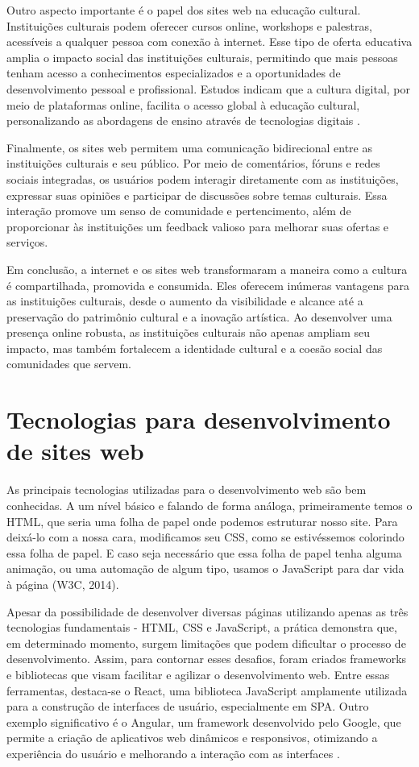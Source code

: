 Outro aspecto importante é o papel dos sites web na educação cultural. Instituições culturais podem oferecer cursos online, workshops e palestras, acessíveis a qualquer pessoa com conexão à internet. Esse tipo de oferta educativa amplia o impacto social das instituições culturais, permitindo que mais pessoas tenham acesso a conhecimentos especializados e a oportunidades de desenvolvimento pessoal e profissional. Estudos indicam que a cultura digital, por meio de plataformas online, facilita o acesso global à educação cultural, personalizando as abordagens de ensino através de tecnologias digitais \cite{xiong2019}.

Finalmente, os sites web permitem uma comunicação bidirecional entre as instituições culturais e seu público. Por meio de comentários, fóruns e redes sociais integradas, os usuários podem interagir diretamente com as instituições, expressar suas opiniões e participar de discussões sobre temas culturais. Essa interação promove um senso de comunidade e pertencimento, além de proporcionar às instituições um feedback valioso para melhorar suas ofertas e serviços.

Em conclusão, a internet e os sites web transformaram a maneira como a cultura é compartilhada, promovida e consumida. Eles oferecem inúmeras vantagens para as instituições culturais, desde o aumento da visibilidade e alcance até a preservação do patrimônio cultural e a inovação artística. Ao desenvolver uma presença online robusta, as instituições culturais não apenas ampliam seu impacto, mas também fortalecem a identidade cultural e a coesão social das comunidades que servem.

\section{Tecnologias para desenvolvimento de sites web}

As principais tecnologias utilizadas para o desenvolvimento web são bem conhecidas. A um nível básico e falando de forma análoga, primeiramente temos o \ac{HTML}, que seria uma folha de papel onde podemos estruturar nosso site. Para deixá-lo com a nossa cara, modificamos seu \ac{CSS}, como se estivéssemos colorindo essa folha de papel. E caso seja necessário que essa folha de papel tenha alguma animação, ou uma automação de algum tipo, usamos o JavaScript para dar vida à página (W3C, 2014).

Apesar da possibilidade de desenvolver diversas páginas utilizando apenas as três tecnologias fundamentais - \ac{HTML}, \ac{CSS} e JavaScript, a prática demonstra que, em determinado momento, surgem limitações que podem dificultar o processo de desenvolvimento. Assim, para contornar esses desafios, foram criados frameworks e bibliotecas que visam facilitar e agilizar o desenvolvimento web. Entre essas ferramentas, destaca-se o React, uma biblioteca JavaScript amplamente utilizada para a construção de interfaces de usuário, especialmente em \ac{SPA}. Outro exemplo significativo é o Angular, um framework desenvolvido pelo Google, que permite a criação de aplicativos web dinâmicos e responsivos, otimizando a experiência do usuário e melhorando a interação com as interfaces \cite{Haverbeke2014}.

